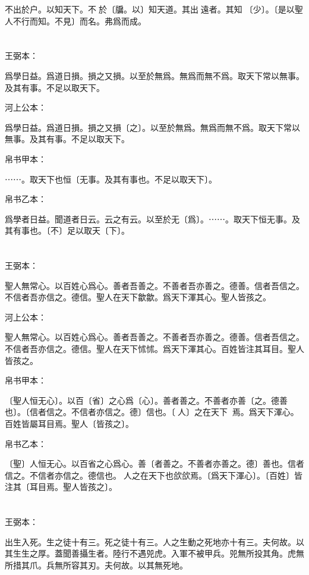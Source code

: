 \documentclass[a5paper]{ctexbook}
\begin{document}
    不出於户。以知天下。不𧠹於〔牖。以〕知天道。其出󱁁遠者。其知󱁁〔少〕。〔是以聖人不行而知。不見〕而名。弗爲而成。

    \chapter{}
    王弼本：

    爲學日益。爲道日損。損之又損。以至於無爲。無爲而無不爲。取天下常以無事。及其有事。不足以取天下。

    河上公本：

    爲學日益。爲道日損。損之又損〔之〕。以至於無爲。無爲而無不爲。取天下常以無事。及其有事。不足以取天下。

    帛书甲本：

    ⋯⋯。取天下也恒〔无事。及其有事也。不足以取天下〕。

    帛书乙本：

    爲學者日益。聞道者日云。云之有云。以至於无〔爲〕。⋯⋯。取天下恒无事。及其有事也。〔不〕足以取天〔下〕。

    \chapter{}
    王弼本：

    聖人無常心。以百姓心爲心。善者吾善之。不善者吾亦善之。德善。信者吾信之。不信者吾亦信之。德信。聖人在天下歙歙。爲天下渾其心。聖人皆孩之。

    河上公本：

    聖人無常心。以百姓心爲心。善者吾善之。不善者吾亦善之。德善。信者吾信之。不信者吾亦信之。德信。聖人在天下怵怵。爲天下渾其心。百姓皆注其耳目。聖人皆孩之。

    帛书甲本：

    〔聖人恒无心〕。以百〔省〕之心爲〔心〕。善者善之。不善者亦善〔之。德善也〕。〔信者信之。不信者亦信之。德〕信也。〔𦔻人〕之在天下𢡁𢡁焉。爲天下渾心。百姓皆屬耳目焉。聖人〔皆孩之〕。

    帛书乙本：

    〔聖〕人恒无心。以百省之心爲心。善〔者善之。不善者亦善之。德〕善也。信者信之。不信者亦信之。德信也。𦔻人之在天下也欱欱焉。〔爲天下渾心〕。〔百姓〕皆注其〔耳目焉。聖人皆孩之〕。

    \chapter{}
    王弼本：

    出生入死。生之徒十有三。死之徒十有三。人之生動之死地亦十有三。夫何故。以其生生之厚。蓋聞善攝生者。陸行不遇兕虎。入軍不被甲兵。兕無所投其角。虎無所措其爪。兵無所容其刃。夫何故。以其無死地。
\end{document}
